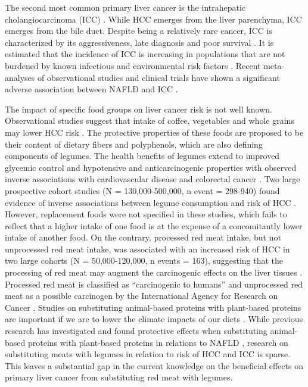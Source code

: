\documentclass[
]{article}
\begin{document}
The second most common primary liver cancer is the intrahepatic
cholangiocarcinoma (ICC) \autocite{Khan2019}. While HCC emerges from the liver
parenchyma, ICC emerges from the bile duct. Despite being a relatively
rare cancer, ICC is characterized by its aggressiveness, late diagnosis
and poor survival \autocite{kirstein2016}. It is estimated that the incidence of
ICC is increasing in populations that are not burdened by known
infectious and environmental risk factors \autocite{Bergquist2015}. Recent
meta-analyses of observational studies and clinical trials have shown a
significant adverse association between NAFLD and ICC
\autocite{Wongjarupong2017,corrao2020}.

The impact of specific food groups on liver cancer risk is not well
known. Observational studies suggest that intake of coffee, vegetables
and whole grains may lower HCC risk \autocite{zhang2013,yang2014,Liu2021,Bhurwal2020}. The protective properties of these foods are proposed to
be their content of dietary fibers and polyphenols, which are also
defining components of legumes. The health benefits of legumes extend to
improved glycemic control and hypotensive and anticarcinogenic
properties with observed inverse associations with cardiovascular
disease and colorectal cancer \autocite{viguiliouk2019,jin2022}. Two large
prospective cohort studies (N = 130,000-500,000, n event = 298-940)
found evidence of inverse associations between legume consumption and
risk of HCC \autocite{zhang2013,Liu2021}. However, replacement foods were not
specified in these studies, which fails to reflect that a higher intake
of one food is at the expense of a concomitantly lower intake of another
food. On the contrary, processed red meat intake, but not unprocessed
red meat intake, was associated with an increased risk of HCC in two
large cohorts (N = 50,000-120,000, n events = 163), suggesting that the
processing of red meat may augment the carcinogenic effects on the liver
tissues \autocite{Ma2019}. Processed red meat is classified as ``carcinogenic to
humans'' and unprocessed red meat as a possible carcinogen by the
International Agency for Research on Cancer \autocite{Bouvard2015}. Studies on
substituting animal-based proteins with plant-based proteins are
important if we are to lower the climate impacts of our diets \autocite{RN71}.
While previous research has investigated and found protective effects
when substituting animal-based proteins with plant-based proteins in
relations to NAFLD \autocite{Zhang2023}, research on substituting meats with
legumes in relation to risk of HCC and ICC is sparse. This leaves a
substantial gap in the current knowledge on the beneficial effects on
primary liver cancer from substituting red meat with legumes.
\end{document}

